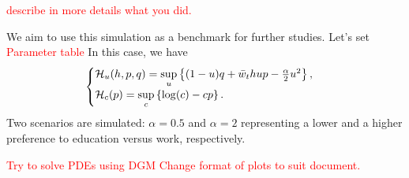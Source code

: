         \textcolor{red}{describe in more details what you did.}
        
        We aim to use this simulation as a benchmark for further studies.        
        Let's set \textcolor{red}{Parameter table}
        In this case, we have 
        \begin{equation}
            \begin{cases}    
            \mathcal{H}_u(h,p,q) = \sup\limits_{u} \left\{ (1 - u)q + \bar w_t h u p - \frac{\alpha}{2} u^2 \right\},\\
            \mathcal{H}_c (p) = \sup\limits_{c} \left\{ \log(c) - cp \right\}.
            \end{cases}
        \end{equation} 
        Two scenarios are simulated: $\alpha = 0.5$ and  $\alpha = 2$ representing a lower and a higher preference to education versus work, respectively.

        \textcolor{red}{Try to solve PDEs using DGM}
        \textcolor{red}{Change format of plots to suit document.}
